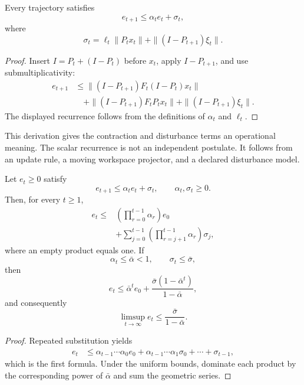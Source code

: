 \begin{SRWTproposition}\label{SRWT:prop:grounded-coherence-recurrence}
Every trajectory satisfies
\[
\boxed{
e_{t+1}\leq\alpha_te_t+\sigma_t,}
\]
where
\[
\boxed{
\sigma_t
=
\ell_t\|P_tx_t\|
+
\|(I-P_{t+1})\xi_t\|.
}
\]
\end{SRWTproposition}

\begin{proof}
Insert \(I=P_t+(I-P_t)\) before \(x_t\), apply \(I-P_{t+1}\), and use
submultiplicativity:
\[
\begin{aligned}
e_{t+1}
&\leq
\|(I-P_{t+1})F_t(I-P_t)x_t\|\\
&\quad+
\|(I-P_{t+1})F_tP_tx_t\|
+
\|(I-P_{t+1})\xi_t\|.
\end{aligned}
\]
The displayed recurrence follows from the definitions of \(\alpha_t\) and
\(\ell_t\).
\end{proof}

This derivation gives the contraction and disturbance terms an operational
meaning. The scalar recurrence is not an independent postulate. It follows
from an update rule, a moving workspace projector, and a declared disturbance
model.


\begin{SRWTtheorem}\label{SRWT:thm:persistence}
Let \(e_t\geq0\) satisfy
\[
e_{t+1}\leq\alpha_te_t+\sigma_t,
\qquad
\alpha_t,\sigma_t\geq0.
\]
Then, for every \(t\geq1\),
\[
\boxed{
\begin{aligned}
e_t
\leq
&\left(\prod_{r=0}^{t-1}\alpha_r\right)e_0\\
&+
\sum_{j=0}^{t-1}
\left(\prod_{r=j+1}^{t-1}\alpha_r\right)\sigma_j,
\end{aligned}
}
\]
where an empty product equals one. If
\[
\alpha_t\leq\bar\alpha<1,
\qquad
\sigma_t\leq\bar\sigma,
\]
then
\[
\boxed{
e_t
\leq
\bar\alpha^te_0
+
\frac{\bar\sigma(1-\bar\alpha^t)}{1-\bar\alpha},
}
\]
and consequently
\[
\boxed{
\limsup_{t\to\infty}e_t
\leq
\frac{\bar\sigma}{1-\bar\alpha}.
}
\]
\end{SRWTtheorem}

\begin{proof}
Repeated substitution yields
\[
\begin{aligned}
e_t
&\leq
\alpha_{t-1}\cdots\alpha_0e_0
+
\alpha_{t-1}\cdots\alpha_1\sigma_0
+
\cdots
+
\sigma_{t-1},
\end{aligned}
\]
which is the first formula. Under the uniform bounds, dominate each product by
the corresponding power of \(\bar\alpha\) and sum the geometric series.
\end{proof}

